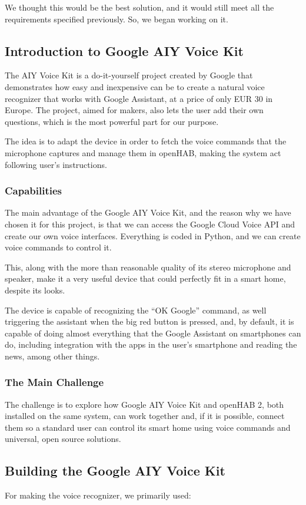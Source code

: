 We thought this would be the best solution, and it would still meet all the requirements specified previously. So, we began working
on it.

\subsection{Introduction to Google AIY Voice Kit}
The AIY Voice Kit is a do-it-yourself project created by Google that demonstrates how easy and inexpensive can be to create a natural
voice recognizer that works with Google Assistant, at a price of only EUR 30 in Europe. The project, aimed for makers, also lets the
user add their own questions, which is the most powerful part for our purpose.

The idea is to adapt the device in order to fetch the voice commands that the microphone captures and manage them in openHAB,
making the system act following user’s instructions.

\subsubsection{Capabilities}
The main advantage of the Google AIY Voice Kit, and the reason why we have chosen it for this project, is that we can access the
Google Cloud Voice API and create our own voice interfaces. Everything is coded in Python, and we can create voice commands to
control it.

This, along with the more than reasonable quality of its stereo microphone and speaker, make it a very useful device that could
perfectly fit in a smart home, despite its looks.

The device is capable of recognizing the “OK Google” command, as well triggering the assistant when the big red button is pressed,
and, by default, it is capable of doing almost everything that the Google Assistant on smartphones can do, including integration
with the apps in the user’s smartphone and reading the news, among other things.

\subsubsection{The Main Challenge}
The challenge is to explore how Google AIY Voice Kit and openHAB 2, both installed on the same system, can work together and,
if it is possible, connect them so a standard user can control its smart home using voice commands and universal, open source solutions.

\subsection{Building the Google AIY Voice Kit}
For making the voice recognizer, we primarily used:

